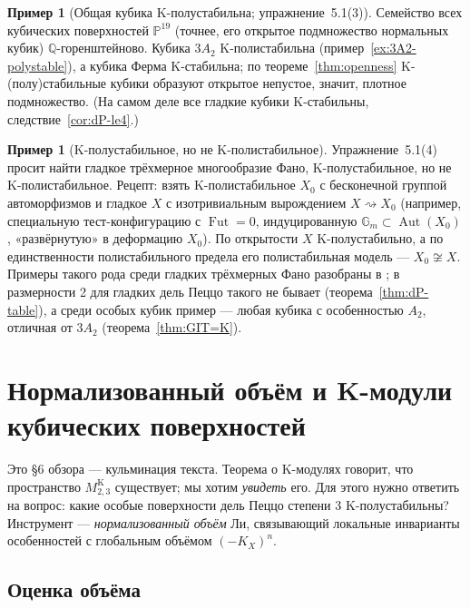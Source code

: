 \documentclass[11pt,a4paper]{article}
\theoremstyle{plain}
\theoremstyle{definition}
\newtheorem{example}[theorem]{Пример}
\theoremstyle{remark}
\newcommand{\Q}{\mathbb{Q}}
\newcommand{\PP}{\mathbb{P}}
\newcommand{\Gm}{\mathbb{G}_m}
\DeclareMathOperator{\Aut}{Aut}
\DeclareMathOperator{\Fut}{Fut}
\begin{document}
\begin{example}[Общая кубика K-полустабильна; упражнение~5.1(3)]
Семейство всех кубических поверхностей $\PP^{19}$ (точнее, его открытое подмножество нормальных
кубик) $\Q$-горенштейново. Кубика $3A_2$ K-полистабильна (пример~\ref{ex:3A2-polystable}), а кубика
Ферма K-стабильна; по теореме~\ref{thm:openness} K-(полу)стабильные кубики образуют открытое
непустое, значит, плотное подмножество. (На самом деле все гладкие кубики K-стабильны,
следствие~\ref{cor:dP-le4}.)
\end{example}

\begin{example}[K-полустабильное, но не K-полистабильное]
Упражнение~5.1(4) просит найти гладкое трёхмерное многообразие Фано, K-полустабильное, но не
K-полистабильное. Рецепт: взять K-полистабильное $X_0$ с бесконечной группой автоморфизмов и
гладкое $X$ с изотривиальным вырождением $X\rightsquigarrow X_0$ (например, специальную
тест-конфигурацию с $\Fut=0$, индуцированную $\Gm\subset\Aut(X_0)$, «развёрнутую» в деформацию $X_0$).
По открытости $X$ K-полустабильно, а по единственности полистабильного предела его полистабильная
модель --- $X_0\not\cong X$. Примеры такого рода среди гладких трёхмерных Фано разобраны в \cite{ACCFKMSV}; в размерности 2 для гладких дель Пеццо такого не бывает (теорема~\ref{thm:dP-table}),
а среди особых кубик пример --- любая кубика с особенностью $A_2$, отличная от $3A_2$
(теорема~\ref{thm:GIT=K}).
\end{example}

\section{Нормализованный объём и K-модули кубических поверхностей}\label{sec:cubic}

Это \S6 обзора --- кульминация текста. Теорема о K-модулях говорит, что пространство
$M^{\mathrm K}_{2,3}$ существует; мы хотим \emph{увидеть} его. Для этого нужно ответить на вопрос:
какие особые поверхности дель Пеццо степени 3 K-полустабильны? Инструмент --- \emph{нормализованный
объём} Ли, связывающий локальные инварианты особенностей с глобальным объёмом $(-K_X)^n$.

\subsection{Оценка объёма}
\end{document}
